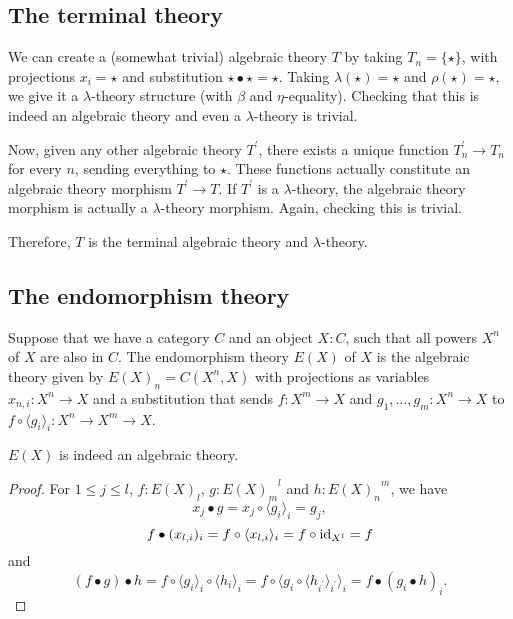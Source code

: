 \subsection{The terminal theory}
\begin{example}
  We can create a (somewhat trivial) algebraic theory $ T $ by taking $ T_n = \{ \star \} $, with projections $ x_i = \star $ and substitution $ \star \bullet \star = \star $. Taking $ \lambda(\star) = \star $ and $ \rho(\star) = \star $, we give it a $ \lambda $-theory structure (with $ \beta $ and $ \eta $-equality). Checking that this is indeed an algebraic theory and even a $ \lambda $-theory is trivial.

  Now, given any other algebraic theory $ T^\prime $, there exists a unique function $ T^\prime_n \to T_n $ for every $ n $, sending everything to $ \star $. These functions actually constitute an algebraic theory morphism $ T^\prime \to T $. If $ T^\prime $ is a $ \lambda $-theory, the algebraic theory morphism is actually a $ \lambda $-theory morphism. Again, checking this is trivial.

  Therefore, $ T $ is the terminal algebraic theory and $ \lambda $-theory.
\end{example}

\subsection{The endomorphism theory}

\begin{definition}
  Suppose that we have a category $ C $ and an object $ X: C $, such that all powers $ X^n $ of $ X $ are also in $ C $.
  The endomorphism theory $ E(X) $ of $ X $ is the algebraic theory given by $ E(X)_n = C(X^n, X) $ with projections as variables $ x_{n, i}: X^n \to X $ and a substitution that sends $ f: X^m \to X $ and $ g_1, \dots, g_m: X^n \to X $ to $ f \circ \langle g_i \rangle_i: X^n \to X^m \to X $.
\end{definition}

\begin{lemma}
  $ E(X) $ is indeed an algebraic theory.
\end{lemma}
\begin{proof}
  For $ 1 \leq j \leq l $, $ f: E(X)_l $, $ g: {E(X)_m}^l $ and $ h: {E(X)_n}^m $, we have
  \[ x_j \bullet g = x_j \circ \langle g_i \rangle_i = g_j, \]
  \[ f \bullet (x_{l,i})_i = f \circ \langle x_{l, i} \rangle_i = f \circ \text{id}_{X^l} = f \]
  and
  \[ (f \bullet g) \bullet h = f \circ \langle g_i \rangle_i \circ \langle h_i \rangle_i = f \circ \langle g_i \circ \langle h_{i^\prime} \rangle_{i^\prime} \rangle_i = f \bullet (g_i \bullet h)_i. \]
\end{proof}

